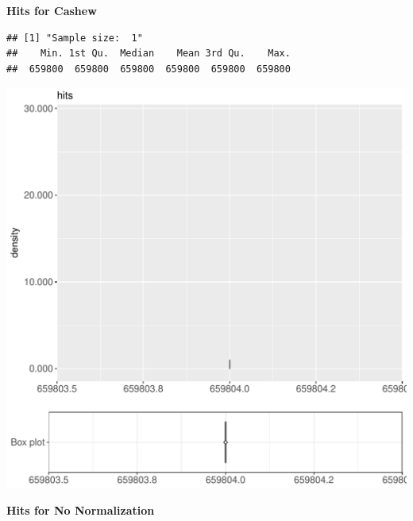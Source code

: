 \documentclass{article}\usepackage[]{graphicx}\usepackage[]{color}
\makeatletter
\def\maxwidth{ %
  \ifdim\Gin@nat@width>\linewidth
    \linewidth
  \else
    \Gin@nat@width
  \fi
}
\newenvironment{kframe}{%
 \def\at@end@of@kframe{}%
 \ifinner\ifhmode%
  \def\at@end@of@kframe{\end{minipage}}%
  \begin{minipage}{\columnwidth}%
 \fi\fi%
 \def\FrameCommand##1{\hskip\@totalleftmargin \hskip-\fboxsep
 \colorbox{shadecolor}{##1}\hskip-\fboxsep
     \hskip-\linewidth \hskip-\@totalleftmargin \hskip\columnwidth}%
 \MakeFramed {\advance\hsize-\width
   \@totalleftmargin\z@ \linewidth\hsize
   \@setminipage}}%
 {\par\unskip\endMakeFramed%
 \at@end@of@kframe}
\newenvironment{knitrout}{}{} %
\makeatother
\begin{document}
 \textbf{Hits for Cashew}
\begin{knitrout}
\color{fgcolor}\begin{kframe}
\begin{verbatim}
## [1] "Sample size:  1"
##    Min. 1st Qu.  Median    Mean 3rd Qu.    Max. 
##  659800  659800  659800  659800  659800  659800
\end{verbatim}


{\ttfamily\noindent\bfseries{}}\end{kframe}
\includegraphics[width=\maxwidth]{figure/RH3_cashew_password2-1} 

\end{knitrout}
 \textbf{Hits for No Normalization}
\end{document}
